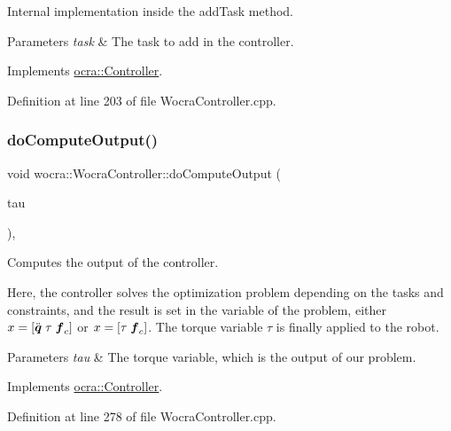 Internal implementation inside the add\+Task method.


\begin{DoxyParams}{Parameters}
{\em task} & The task to add in the controller. \\
\hline
\end{DoxyParams}


Implements \hyperlink{classocra_1_1Controller_ab3477822a9363553c99eefa58ff803eb}{ocra\+::\+Controller}.



Definition at line 203 of file Wocra\+Controller.\+cpp.

\hypertarget{classwocra_1_1WocraController_aaf750c45d062220e3f78ccb1c8a41d07}{}\label{classwocra_1_1WocraController_aaf750c45d062220e3f78ccb1c8a41d07} 
\subsubsection{\texorpdfstring{do\+Compute\+Output()}{doComputeOutput()}}
{\footnotesize\ttfamily void wocra\+::\+Wocra\+Controller\+::do\+Compute\+Output (\begin{DoxyParamCaption}\item[{Eigen\+::\+Vector\+Xd \&}]{tau }\end{DoxyParamCaption})\hspace{0.3cm}{\ttfamily [protected]}, {\ttfamily [virtual]}}

Computes the output of the controller.

Here, the controller solves the optimization problem depending on the tasks and constraints, and the result is set in the variable of the problem, either $ x = [ \ddot{\mbox{\boldmath${q}$}} \; \tau \; \mbox{\boldmath${f}$}_c ] $ or $ x = [ \tau \; \mbox{\boldmath${f}$}_c ] $. The torque variable $ \tau $ is finally applied to the robot.


\begin{DoxyParams}{Parameters}
{\em tau} & The torque variable, which is the output of our problem. \\
\hline
\end{DoxyParams}


Implements \hyperlink{classocra_1_1Controller_a8ca85413067d948459afa5981b3dda32}{ocra\+::\+Controller}.



Definition at line 278 of file Wocra\+Controller.\+cpp.

